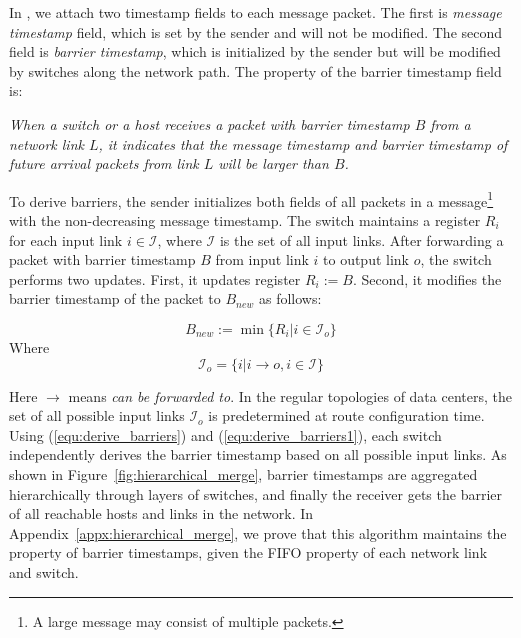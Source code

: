 In \sys, we attach two timestamp fields to each message packet. The first is \textit{message timestamp} field, which is set by the sender and will not be modified. The second field is \textit{barrier timestamp}, which is initialized by the sender but will be modified by switches along the network path. The property of the barrier timestamp field is:

\emph{When a switch or a host receives a packet with barrier timestamp $B$ from a network link $L$, it indicates that the message timestamp and barrier timestamp of future arrival packets from link $L$ will be larger than $B$.}

To derive barriers, the sender initializes both fields of all packets in a message\footnote{A large message may consist of multiple packets.} with the non-decreasing message timestamp. The switch maintains a register $R_i$ for each input link $i \in \mathcal{I}$, where $\mathcal{I}$ is the set of all input links. After forwarding a packet with barrier timestamp $B$ from input link $i$ to output link $o$, the switch performs two updates. First, it updates register $R_i := B$. Second, it modifies the barrier timestamp of the packet to $B_{new}$ as follows:

\begin{equation}\label{equ:derive_barriers}
B_{new}:=\min\{R_i| i\in \mathcal{I}_o\}
\end{equation}
Where 
\begin{equation}\label{equ:derive_barriers1}
\mathcal{I}_o =\{i| i\rightarrow o, i \in \mathcal{I} \}
\end{equation}

Here $\rightarrow$ means \textit{can be forwarded to}. In the regular topologies of data centers, the set of all possible input links $\mathcal{I}_o$ is predetermined at route configuration time. Using (\ref{equ:derive_barriers}) and (\ref{equ:derive_barriers1}), each switch independently derives the barrier timestamp based on all possible input links. As shown in Figure~\ref{fig:hierarchical_merge}, barrier timestamps are aggregated hierarchically through layers of switches, and finally the receiver gets the barrier of all reachable hosts and links in the network. In Appendix~\ref{appx:hierarchical_merge}, we prove that this algorithm maintains the property of barrier timestamps, given the FIFO property of each network link and switch.

